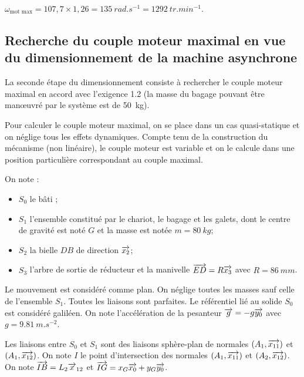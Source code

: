\documentclass[10pt,fleqn]{article} %
\begin{document}
\begin{multicols}{2}
\begin{multicols}{2}
\ifprof
\begin{corrige}
$\omega_{\text{mot max}}=107,7\times 1,26 = \SI{135}{rad.s^{-1}}=\SI{1292}{tr.min^{-1}}$.
\end{corrige}
\else
\fi

\subsection*{Recherche du couple moteur maximal en vue du dimensionnement de la machine asynchrone}

\begin{obj}
La seconde étape du dimensionnement consiste à rechercher le couple moteur maximal en accord avec
l’exigence 1.2 (la masse du bagage pouvant être manœuvré par le système est de \SI{50}{kg}).
\end{obj}


\ifprof
\else


Pour calculer le couple moteur maximal, on se place dans un cas quasi-statique et on néglige tous les effets
dynamiques. Compte tenu de la construction du mécanisme (non linéaire), le couple moteur est variable et on
le calcule dans une position particulière correspondant au couple maximal.

On note :
\begin{itemize}
\item $S_0$ le bâti ;
\item $S_1$ l’ensemble constitué par le chariot, le bagage et les galets, dont le centre de gravité est noté $G$ et la masse est notée $m=\SI{80}{kg}$;
\item $S_2$ la bielle $DB$ de direction $\overrightarrow{x_2}$;
\item $S_3$ l’arbre de sortie de réducteur et la manivelle $\overrightarrow{ED}=R\overrightarrow{x_3}$ avec $R=\SI{86}{mm}$.
\end{itemize}
Le mouvement est considéré comme plan. On néglige toutes les masses sauf celle de l’ensemble $S_1$. Toutes les liaisons sont parfaites. Le référentiel lié au solide $S_0$ est considéré galiléen. On note l’accélération de la pesanteur $\overrightarrow{g}=-g\overrightarrow{y_0}$ avec $g=\SI{9,81}{m.s^{-2}}$.

Les liaisons entre $S_0$ et $S_1$ sont des liaisons sphère-plan de normales $\left(A_1,\overrightarrow{{x}_{11}}\right)$ et $\left(A_1,\overrightarrow{{x}_{12}}\right)$.
On note $I$ le point d’intersection des normales $\left(A_1,\overrightarrow{{x}_{11}}\right)$ et $\left(A_2,\overrightarrow{{x}_{12}}\right)$. On note $\overrightarrow{IB}=L_2\overrightarrow{x}_{12}$ et $\overrightarrow{IG}=x_G\overrightarrow{x_{0}}+y_G\overrightarrow{y_{0}}$.


\end{multicols}
\end{multicols}
\end{document}
